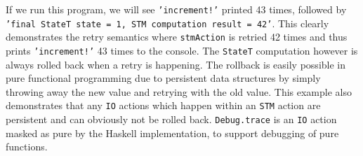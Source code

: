 \medskip %

If we run this program, we will see \texttt{'increment!'} printed 43 times, followed by \texttt{'final StateT state = 1, STM computation result = 42'}. This clearly demonstrates the retry semantics where \texttt{stmAction} is retried 42 times and thus prints \texttt{'increment!'} 43 times to the console. The \texttt{StateT} computation however is always rolled back when a retry is happening. The rollback is easily possible in pure functional programming due to persistent data structures by simply throwing away the new value and retrying with the old value. This example also demonstrates that any \texttt{IO} actions which happen within an \texttt{STM} action are persistent and can obviously not be rolled back. \texttt{Debug.trace} is an \texttt{IO} action masked as pure by the Haskell implementation, to support debugging of pure functions.